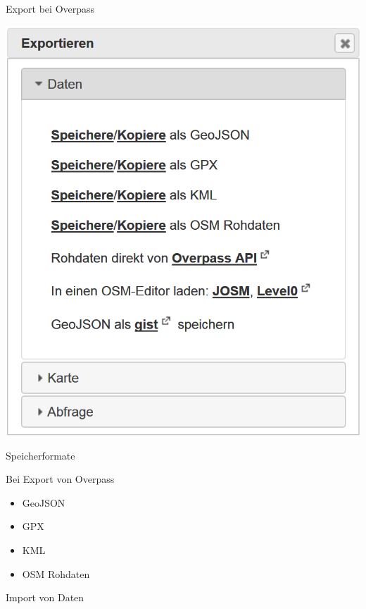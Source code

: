 \documentclass[ignorenonframetext,]{beamer}
\providecommand{\tightlist}{%
  \setlength{\itemsep}{0pt}\setlength{\parskip}{0pt}}
\begin{document}
\begin{frame}{Export bei Overpass}
\protect\hypertarget{export-bei-overpass}{}

\includegraphics{figure/OverpassExport.PNG}

\end{frame}

\begin{frame}{Speicherformate}
\protect\hypertarget{speicherformate}{}

\begin{block}{Bei Export von Overpass}

\begin{itemize}
\tightlist
\item
  GeoJSON
\item
  GPX
\item
  KML
\item
  OSM Rohdaten
\end{itemize}

\end{block}

\end{frame}

\begin{frame}{Import von Daten}
\protect\hypertarget{import-von-daten}{}

\end{frame}
\end{document}
